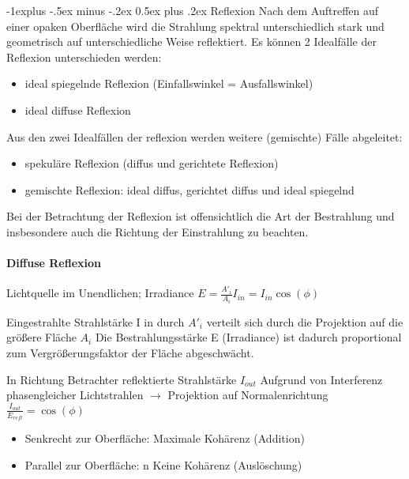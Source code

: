 \documentclass[10pt,landscape]{article}
\makeatletter
\renewcommand{\subsection}{\@startsection{subsection}{2}{0mm}%
                                {-1explus -.5ex minus -.2ex}%
                                {0.5ex plus .2ex}%
                                {\normalfont\normalsize\bfseries}}
\makeatother
\begin{document}
\begin{multicols}{3}
  
  \subsection{ Reflexion}
  Nach dem Auftreffen auf einer opaken Oberfläche wird die Strahlung spektral
  unterschiedlich stark und geometrisch auf unterschiedliche Weise reflektiert. Es
  können 2 Idealfälle der Reflexion unterschieden werden:
  \begin{itemize}
    \item ideal spiegelnde Reflexion (Einfallswinkel = Ausfallswinkel)
    \item ideal diffuse Reflexion
  \end{itemize}
  
  Aus den zwei Idealfällen der reflexion werden weitere (gemischte) Fälle abgeleitet:
  \begin{itemize}
    \item spekuläre Reflexion (diffus und gerichtete Reflexion)
    \item gemischte Reflexion: ideal diffus, gerichtet diffus und ideal spiegelnd
  \end{itemize}
  
  Bei der Betrachtung der Reflexion ist offensichtlich die Art der Bestrahlung und
  insbesondere auch die Richtung der Einstrahlung zu beachten.
  
  \paragraph{Diffuse Reflexion}
  
  Lichtquelle im Unendlichen; Irradiance $E=\frac{A'_i}{A_i}I_{in}=I_{in}\cos(\phi)$
  
  Eingestrahlte Strahlstärke I in durch $A'_i$ verteilt sich durch die Projektion auf die größere Fläche $A_i$ Die Bestrahlungsstärke E (Irradiance) ist dadurch proportional zum Vergrößerungsfaktor der Fläche abgeschwächt.
  
  In Richtung Betrachter reflektierte Strahlstärke $I_{out}$ Aufgrund von Interferenz phasengleicher Lichtstrahlen $\rightarrow$ Projektion auf Normalenrichtung $\frac{I_{out}}{E_{refl}}=\cos(\phi)$
  \begin{itemize}
    \item Senkrecht zur Oberfläche: Maximale Kohärenz (Addition)
    \item Parallel zur Oberfläche: n Keine Kohärenz (Auslöschung)
  \end{itemize}
  

\end{multicols}
\end{document}
